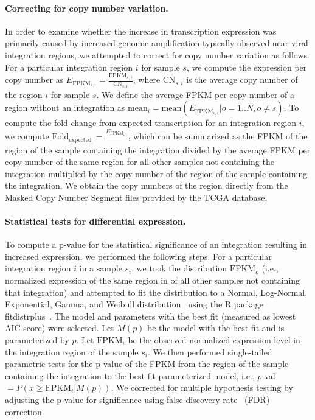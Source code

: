 \documentclass{bmcart}
\begin{document}
\paragraph{\textbf{Correcting for copy number variation.}}
In order to examine whether the increase in transcription expression was primarily caused by increased genomic amplification typically observed near viral integration regions, we attempted to correct for copy number variation as follows.  For a particular integration region $i$ for sample $s$, we compute the expression per copy number as $E_{\mbox{FPKM}_{s,i}}=\frac{\mbox{FPKM}_{s,i}}{\mbox{CN}_{s,i}}$, where $\mbox{CN}_{s,i}$ is the average copy number of the region $i$ for sample $s$.  We define the average FPKM per copy number of a region without an integration as $\mbox{mean}_{i}=\mbox{mean}(E_{\mbox{FPKM}_{o,i}}|o=1..N,o\ne s)$.  To compute the fold-change from expected transcription for an integration region $i$, we compute $\mbox{Fold}_{\mbox{expected}_i}=\frac{E_{\mbox{FPKM}_{s,i}}}{}$, which can be summarized as the FPKM of the region of the sample containing the integration divided by the average FPKM per copy number of the same region for all other samples not containing the integration multiplied by the copy number of the region of the sample containing the integration.  We obtain the copy numbers of the region directly from the Masked Copy Number Segment files provided by the TCGA database.  

\paragraph{\textbf{Statistical tests for differential expression.}}
To compute a p-value for the statistical significance of an integration resulting in increased expression, we performed the following steps.  For a particular integration region $i$ in a sample $s_i$, we took the distribution $\mbox{FPKM}_{o}$ (i.e., normalized expression of the same region in of all other samples not containing that integration) and attempted to fit the distribution to a Normal, Log-Normal, Exponential, Gamma, and Weibull distribution~\cite{Weibull1951} using the R package fitdistrplus~\cite{Delignette-muller2015}.  The model and parameters with the best fit (measured as lowest AIC score) were selected.  Let $M(p)$ be the model with the best fit and is parameterized by $p$.  Let $\mbox{FPKM}_i$ be the observed normalized expression level in the integration region of the sample $s_i$.  We then performed single-tailed parametric tests for the p-value of the FPKM from the region of the sample containing the integration to the best fit parameterized model, i.e., $p$-val$ =P(x\ge\mbox{FPKM}_i|M(p))$.  We corrected for multiple hypothesis testing by adjusting the p-value for significance using false discovery rate~\cite{Benjamini1995} (FDR) correction.  
\end{document}
